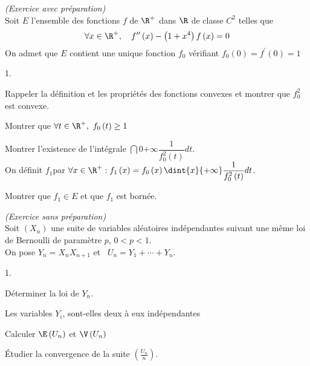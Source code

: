 \documentclass[11pt]{article}%
\begin{document}
\newpage


\begin{exercice}{\it (Exercice avec préparation)}~\\
  Soit $E$ l'ensemble des fonctions $f$ de $\R^{+}$ dans $\R$ de
  classe $C^{2}$ telles que
  \[
  \forall x\in \R^{+},\quad f^{\prime \prime }\left( x\right) -\left(
    1+x^{4}\right) f\left( x\right) =0
  \]
  On admet que $E$ contient une unique fonction $f_{0}$ vérifiant $%
  f_{0}\left( 0\right) =f^{\prime }\left( 0\right) =1$

  \begin{noliste}{1.}
  \item Rappeler la définition et les propriétés des fonctions
    convexes et montrer que $f_{0}^{2}$ est convexe.

  \item Montrer que $\forall t\in \R^{+},\ f_{0}\left( t\right) \geq 1$

  \item Montrer l'existence de l'intégrale $\dint{0}{+\infty
    }\dfrac{1}{ f_{0}^{2}\left( t\right) }dt$.\\[.2cm]
    On définit $f_{1}$par $\forall x\in \R^{+}:f_{1}\left( x\right)
    =f_{0}\left( x\right) \dint{x}{+\infty }\dfrac{1}{f_{0}^{2}\left(
        t\right) }dt$.

  \item Montrer que $f_{1}\in E$ et que $f_{1}$ est bornée.
  \end{noliste}
\end{exercice}

\addtocounter{exercice}{-1}
\begin{exercice}{\it (Exercice sans préparation)}~\\
  Soit $\left( X_{n}\right) $ une suite de variables aléatoires
  indépendantes suivant une même loi de Bernoulli de paramètre $p$,
  $0<p<1$.\\
  On pose $Y_{n}=X_{n}X_{n+1}$ et \ $U_{n}=Y_{1}+\cdots +Y_{n}$.
  \begin{noliste}{1.}
  \item Déterminer la loi de $Y_{n}$.
  \item Les variables $Y_{i}$, sont-elles deux à eux indépendantes
  \item Calculer $\E\left( U_n\right) $ et $\V\left( U_{n}\right) $
  \item Étudier la convergence de la suite $\left(
      \frac{U_{n}}{n}\right) $.
  \end{noliste}
\end{exercice}
\end{document}
